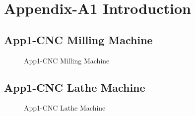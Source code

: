\clearpage
\pagebreak
\justifying
\renewcommand{\thesection}{A \arabic{section}}

\titleformat{\section}{\normalfont\LARGE\bfseries\color{black}}{\thesection}{10pt}{\LARGE}
\section{Appendix-A1 Introduction}\label{sec:App1-Introduction}

\subsection{App1-CNC Milling Machine}
\begin{figure}[htbp]
	\begin{center}
		\caption{App1-CNC Milling Machine}
		\label{fig:App1-CNC-Milling-Machine.jpg}
	\end{center}
\end{figure}

\subsection{App1-CNC Lathe Machine}
\begin{figure}[htbp]
	\begin{center}
		\caption{App1-CNC Lathe Machine}
		\label{fig:App1-CNC-Lathe-Machine.jpg}
	\end{center}
\end{figure}


